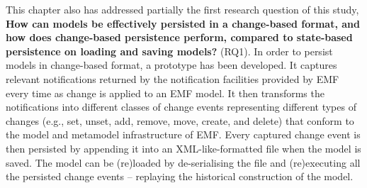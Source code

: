 This chapter also has addressed partially the first research question of this study, \textbf{How can models be effectively persisted in a change-based format, and how does change-based persistence perform, compared to state-based persistence on loading and saving models?} (RQ1). In order to persist models in change-based format, a prototype has been developed. It captures relevant notifications returned by the notification facilities provided by EMF every time as change is applied to an EMF model. It then transforms the notifications into different classes of change events representing different types of changes (e.g., set, unset, add, remove, move, create, and delete) that conform to the model and metamodel infrastructure of EMF. Every captured change event is then persisted by appending it into an XML-like-formatted file when the model is saved. The model can be (re)loaded by de-serialising the file and (re)executing all the persisted change events -- replaying the historical construction of the model.


